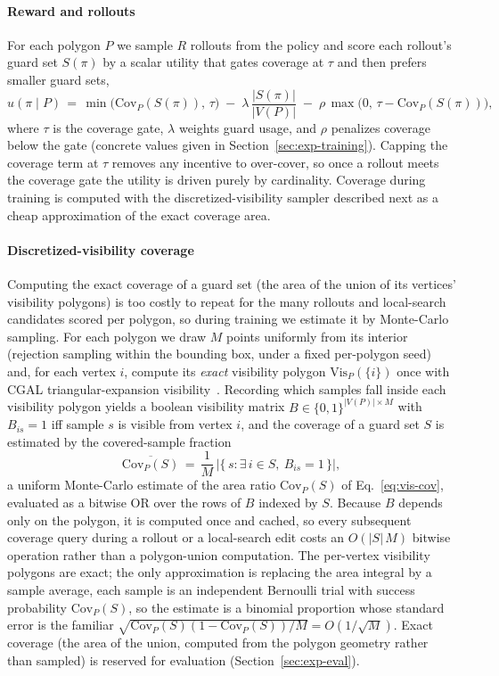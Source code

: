 \documentclass[11pt]{article}
\newcommand{\Vis}[1]{\mathrm{Vis}_P(#1)}
\newcommand{\Covf}[1]{\mathrm{Cov}_P(#1)}
\begin{document}
\paragraph{Reward and rollouts} For each polygon $P$ we sample $R$ rollouts from the policy and score each rollout's guard set $S(\pi)$ by a scalar utility that gates coverage at $\tau$ and then prefers smaller guard sets,
\begin{equation}
u(\pi \mid P) \,=\, \min\!\big(\Covf{S(\pi)},\, \tau\big) \;-\; \lambda\,\frac{|S(\pi)|}{|V(P)|} \;-\; \rho\,\max\!\big(0,\, \tau - \Covf{S(\pi)}\big),
\label{eq:reward}
\end{equation}
where $\tau$ is the coverage gate, $\lambda$ weights guard usage, and $\rho$ penalizes coverage below the gate (concrete values given in Section~\ref{sec:exp-training}). Capping the coverage term at $\tau$ removes any incentive to over-cover, so once a rollout meets the coverage gate the utility is driven purely by cardinality. Coverage during training is computed with the discretized-visibility sampler described next as a cheap approximation of the exact coverage area.

\paragraph{Discretized-visibility coverage} Computing the exact coverage of a guard set (the area of the union of its vertices' visibility polygons) is too costly to repeat for the many rollouts and local-search candidates scored per polygon, so during training we estimate it by Monte-Carlo sampling. For each polygon we draw $M$ points uniformly from its interior (rejection sampling within the bounding box, under a fixed per-polygon seed) and, for each vertex $i$, compute its \emph{exact} visibility polygon $\Vis{\{i\}}$ once with CGAL triangular-expansion visibility~\cite{cgal:eb-25b}. Recording which samples fall inside each visibility polygon yields a boolean visibility matrix $B \in \{0,1\}^{|V(P)| \times M}$ with $B_{is} = 1$ iff sample $s$ is visible from vertex $i$, and the coverage of a guard set $S$ is estimated by the covered-sample fraction
\begin{equation}
\overline{\Covf{S}} \,=\, \frac{1}{M}\,\Big|\big\{\, s : \exists\, i \in S,\ B_{is} = 1 \,\big\}\Big|,
\label{eq:discrete visibility}
\end{equation}
a uniform Monte-Carlo estimate of the area ratio $\Covf{S}$ of Eq.~\eqref{eq:vis-cov}, evaluated as a bitwise OR over the rows of $B$ indexed by $S$. Because $B$ depends only on the polygon, it is computed once and cached, so every subsequent coverage query during a rollout or a local-search edit costs an $O(|S|\,M)$ bitwise operation rather than a polygon-union computation. The per-vertex visibility polygons are exact; the only approximation is replacing the area integral by a sample average, each sample is an independent Bernoulli trial with success probability $\Covf{S}$, so the estimate is a binomial proportion whose standard error is the familiar $\sqrt{\Covf{S}(1-\Covf{S})/M} = O(1/\sqrt{M})$. Exact coverage (the area of the union, computed from the polygon geometry rather than sampled) is reserved for evaluation (Section~\ref{sec:exp-eval}).
\end{document}
